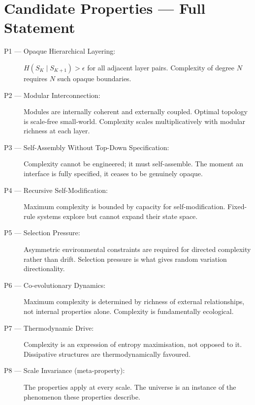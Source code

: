 \documentclass[12pt,a4paper]{article}
\begin{document}

\appendix

\section{Candidate Properties — Full Statement}

\begin{description}
  \item[P1 — Opaque Hierarchical Layering:]
    $H(S_K \mid S_{K+1}) > \epsilon$ for all adjacent layer pairs.
    Complexity of degree $N$ requires $N$ such opaque boundaries.

  \item[P2 — Modular Interconnection:]
    Modules are internally coherent and externally coupled.
    Optimal topology is scale-free small-world.
    Complexity scales multiplicatively with modular richness at each layer.

  \item[P3 — Self-Assembly Without Top-Down Specification:]
    Complexity cannot be engineered; it must self-assemble.
    The moment an interface is fully specified, it ceases to be genuinely opaque.

  \item[P4 — Recursive Self-Modification:]
    Maximum complexity is bounded by capacity for self-modification.
    Fixed-rule systems explore but cannot expand their state space.

  \item[P5 — Selection Pressure:]
    Asymmetric environmental constraints are required for directed
    complexity rather than drift.
    Selection pressure is what gives random variation directionality.

  \item[P6 — Co-evolutionary Dynamics:]
    Maximum complexity is determined by richness of external relationships,
    not internal properties alone.
    Complexity is fundamentally ecological.

  \item[P7 — Thermodynamic Drive:]
    Complexity is an expression of entropy maximisation, not opposed to it.
    Dissipative structures are thermodynamically favoured.

  \item[P8 — Scale Invariance (meta-property):]
    The properties apply at every scale.
    The universe is an instance of the phenomenon these properties describe.
\end{description}
\end{document}
